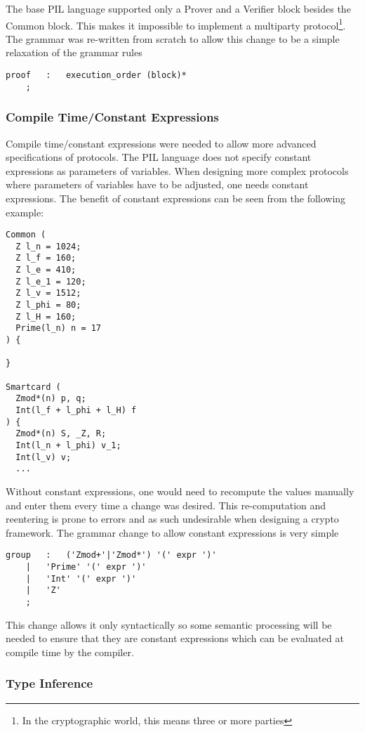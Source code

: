 The base PIL language supported only a Prover and a Verifier block
besides the Common block. This makes it impossible to implement a
multiparty protocol\footnote{In the cryptographic world, this means
  three or more parties}. The grammar was re-written from scratch to
allow this change to be a simple relaxation of the grammar rules
\begin{lstlisting}[language=grammar, keywords={proof, execution_order, block}]
proof	:	execution_order (block)*
	;
\end{lstlisting}

\subsubsection{Compile Time/Constant Expressions}

Compile time/constant expressions were needed to allow more advanced
specifications of protocols. The PIL language does not specify
constant expressions as parameters of variables. When designing more
complex protocols where parameters of variables have to be adjusted,
one needs constant expressions. The benefit of constant expressions
can be seen from the following example:
\begin{lstlisting}[language=PIL]
Common (
  Z l_n = 1024;
  Z l_f = 160;
  Z l_e = 410;
  Z l_e_1 = 120;
  Z l_v = 1512;
  Z l_phi = 80;
  Z l_H = 160;
  Prime(l_n) n = 17
) {

}

Smartcard (
  Zmod*(n) p, q;
  Int(l_f + l_phi + l_H) f
) {
  Zmod*(n) S, _Z, R;
  Int(l_n + l_phi) v_1;
  Int(l_v) v;
  ...
\end{lstlisting}
Without constant expressions, one would need to recompute the values
manually and enter them every time a change was desired. This
re-computation and reentering is prone to errors and as such
undesirable when designing a crypto framework. The grammar change to
allow constant expressions is very simple
\begin{lstlisting}[language=grammar, keywords={group, expr}]
group	:	('Zmod+'|'Zmod*') '(' expr ')' 
	|	'Prime' '(' expr ')'
	|	'Int' '(' expr ')'
	|	'Z'
	;
\end{lstlisting}
This change allows it only syntactically so some semantic processing
will be needed to ensure that they are constant expressions which can
be evaluated at compile time by the compiler.

\subsubsection{Type Inference}

